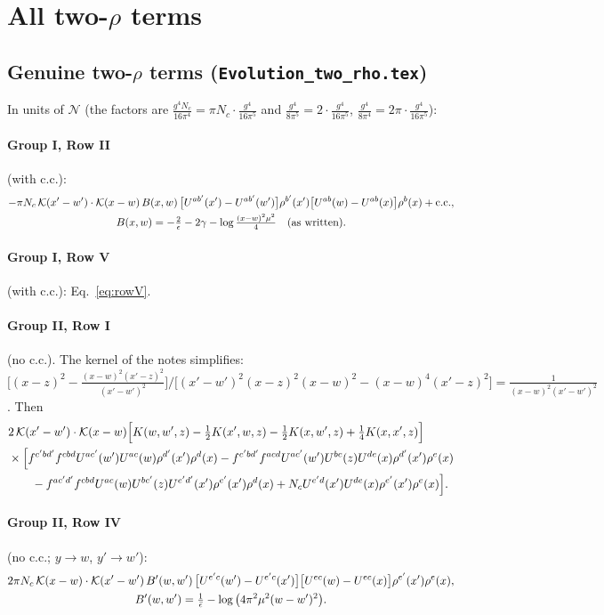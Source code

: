 \documentclass[10pt]{article}
\numberwithin{equation}{section}
\newcommand{\KK}{\mathcal K}
\newcommand{\NN}{\mathcal N}
\begin{document}
\section{All two-\texorpdfstring{$\rho$}{rho} terms}\label{sec:all}
\subsection{Genuine two-\texorpdfstring{$\rho$}{rho} terms (\texttt{Evolution\_two\_rho.tex})}\label{sec:genuine}
In units of $\NN$ (the factors are $\frac{g^4N_c}{16\pi^4}=\pi N_c\cdot\frac{g^4}{16\pi^5}$ and $\frac{g^4}{8\pi^5}=2\cdot\frac{g^4}{16\pi^5}$, $\frac{g^4}{8\pi^4}=2\pi\cdot\frac{g^4}{16\pi^5}$):
\paragraph{Group I, Row II} (with c.c.):
\begin{gather}
-\pi N_c\,\KK(x'-w')\cdot\KK(x-w)\,B(x,w)\,\big[U^{ab'}(x')-U^{ab'}(w')\big]\rho^{b'}(x')\big[U^{ab}(w)-U^{ab}(x)\big]\rho^b(x)+{\rm c.c.},\notag\\
B(x,w)=-\tfrac2\epsilon-2\gamma-\log\tfrac{(x-w)^2\mu^2}{4}\quad\text{(as written)}.
\end{gather}
\paragraph{Group I, Row V} (with c.c.): Eq.~\eqref{eq:rowV}.
\paragraph{Group II, Row I} (no c.c.). The kernel of the notes simplifies: $\big[(x-z)^2-\frac{(x-w)^2(x'-z)^2}{(x'-w')^2}\big]\big/\big[(x'-w')^2(x-z)^2(x-w)^2-(x-w)^4(x'-z)^2\big]=\frac{1}{(x-w)^2(x'-w')^2}$. Then
\begin{align}
&2\,\KK(x'-w')\cdot\KK(x-w)\Big[K(w,w',z)-\tfrac12K(x',w,z)-\tfrac12K(x,w',z)+\tfrac14K(x,x',z)\Big]\notag\\
&\times\Big[f^{c'bd'}f^{cbd}U^{ac'}(w')U^{ac}(w)\rho^{d'}(x')\rho^d(x)-f^{c'bd'}f^{acd}U^{ac'}(w')U^{bc}(z)U^{de}(x)\rho^{d'}(x')\rho^e(x)\notag\\
&\qquad-f^{ac'd'}f^{cbd}U^{ac}(w)U^{bc'}(z)U^{e'd'}(x')\rho^{e'}(x')\rho^d(x)+N_cU^{e'd}(x')U^{de}(x)\rho^{e'}(x')\rho^e(x)\Big].
\end{align}
\paragraph{Group II, Row IV} (no c.c.; $y\to w$, $y'\to w'$):
\begin{gather}
2\pi N_c\,\KK(x-w)\cdot\KK(x'-w')\,B'(w,w')\,\big[U^{e'c}(w')-U^{e'c}(x')\big]\big[U^{ec}(w)-U^{ec}(x)\big]\rho^{e'}(x')\rho^e(x),\notag\\
B'(w,w')=\tfrac1{\bar\epsilon}-\log\big(4\pi^2\mu^2(w-w')^2\big).
\end{gather}
\end{document}
